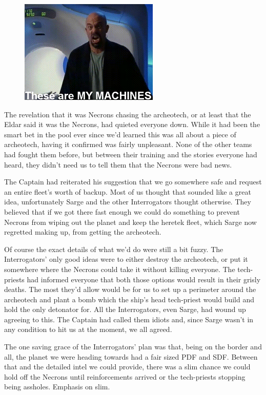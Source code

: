\begin{figure}
	\begin{center}
		\includegraphics[width=\figwidth]{pics/11/66.png}
	\end{center}
\end{figure}
The revelation that it was Necrons chasing the archeotech, or at least that the Eldar said it was the Necrons, had quieted everyone down. 
While it had been the smart bet in the pool ever since we'd learned this was all about a piece of archeotech, having it confirmed was fairly unpleasant. 
None of the other teams had fought them before, but between their training and the stories everyone had heard, they didn't need us to tell them that the Necrons were bad news.

The Captain had reiterated his suggestion that we go somewhere safe and request an entire fleet's worth of backup. 
Most of us thought that sounded like a great idea, unfortunately Sarge and the other Interrogators thought otherwise. 
They believed that if we got there fast enough we could do something to prevent Necrons from wiping out the planet and keep the heretek fleet, which Sarge now regretted making up, from getting the archeotech. 


Of course the exact details of what we'd do were still a bit fuzzy. 
The Interrogators' only good ideas were to either destroy the archeotech, or put it somewhere where the Necrons could take it without killing everyone. 
The tech-priests had informed everyone that both those options would result in their grisly deaths. 
The most they'd allow would be for us to set up a perimeter around the archeotech and plant a bomb which the ship's head tech-priest would build and hold the only detonator for. 
All the Interrogators, even Sarge, had wound up agreeing to this. 
The Captain had called them idiots and, since Sarge wasn't in any condition to hit us at the moment, we all agreed.

The one saving grace of the Interrogators' plan was that, being on the border and all, the planet we were heading towards had a fair sized PDF and SDF. 
Between that and the detailed intel we could provide, there was a slim chance we could hold off the Necrons until reinforcements arrived or the tech-priests stopping being assholes. 
Emphasis on slim.

